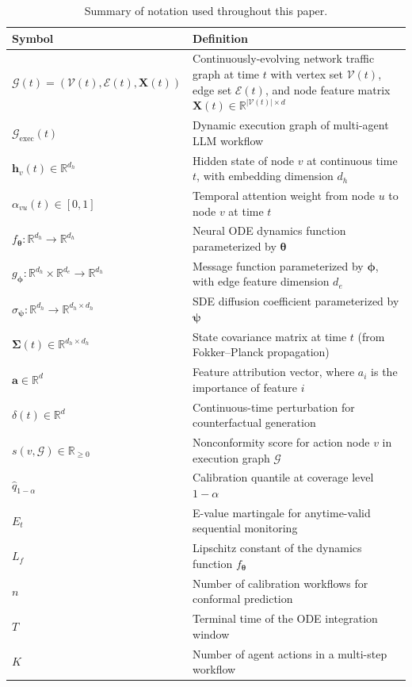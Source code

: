 \documentclass[preprint,review,12pt]{elsarticle}
\newcommand{\vh}{\mathbf{h}}            %
\newcommand{\vX}{\mathbf{X}}            %
\newcommand{\va}{\mathbf{a}}            %
\newcommand{\vSigma}{\boldsymbol{\Sigma}} %
\newcommand{\vtheta}{\boldsymbol{\theta}} %
\newcommand{\vphi}{\boldsymbol{\phi}}     %
\newcommand{\vpsi}{\boldsymbol{\psi}}     %
\newcommand{\R}{\mathbb{R}}
\newcommand{\calG}{\mathcal{G}}
\newcommand{\calV}{\mathcal{V}}
\newcommand{\calE}{\mathcal{E}}
\begin{document}
\begin{table}[!t]
\centering
\caption{Summary of notation used throughout this paper.}
\label{tab:notation}
\begin{tabularx}{\textwidth}{@{}lX@{}}
\toprule
\textbf{Symbol} & \textbf{Definition} \\
\midrule
$\calG(t) = (\calV(t), \calE(t), \vX(t))$ & Continuously-evolving network traffic graph at time $t$ with vertex set $\calV(t)$, edge set $\calE(t)$, and node feature matrix $\vX(t) \in \R^{|\calV(t)| \times d}$ \\
$\calG_{\mathrm{exec}}(t)$ & Dynamic execution graph of multi-agent LLM workflow \\
$\vh_v(t) \in \R^{d_h}$ & Hidden state of node $v$ at continuous time $t$, with embedding dimension $d_h$ \\
$\alpha_{vu}(t) \in [0,1]$ & Temporal attention weight from node $u$ to node $v$ at time $t$ \\
$f_{\vtheta}: \R^{d_h} \to \R^{d_h}$ & Neural ODE dynamics function parameterized by $\vtheta$ \\
$g_{\vphi}: \R^{d_h} \times \R^{d_e} \to \R^{d_h}$ & Message function parameterized by $\vphi$, with edge feature dimension $d_e$ \\
$\sigma_{\vpsi}: \R^{d_h} \to \R^{d_h \times d_h}$ & SDE diffusion coefficient parameterized by $\vpsi$ \\
$\vSigma(t) \in \R^{d_h \times d_h}$ & State covariance matrix at time $t$ (from Fokker--Planck propagation) \\
$\va \in \R^{d}$ & Feature attribution vector, where $a_i$ is the importance of feature $i$ \\
$\delta(t) \in \R^d$ & Continuous-time perturbation for counterfactual generation \\
$s(v, \calG) \in \R_{\geq 0}$ & Nonconformity score for action node $v$ in execution graph $\calG$ \\
$\hat{q}_{1-\alpha}$ & Calibration quantile at coverage level $1 - \alpha$ \\
$E_t$ & E-value martingale for anytime-valid sequential monitoring \\
$L_f$ & Lipschitz constant of the dynamics function $f_{\vtheta}$ \\
$n$ & Number of calibration workflows for conformal prediction \\
$T$ & Terminal time of the ODE integration window \\
$K$ & Number of agent actions in a multi-step workflow \\
\bottomrule
\end{tabularx}
\end{table}
\end{document}

